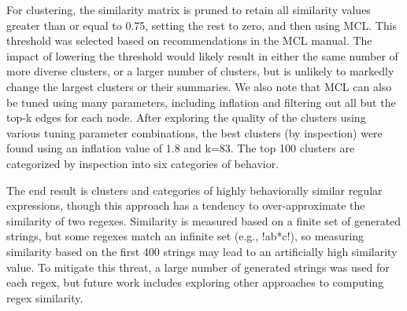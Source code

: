 For clustering, the similarity matrix is pruned to retain all similarity values greater than or equal to 0.75, setting the rest to zero, and then using MCL.
This threshold was selected based on recommendations in the MCL manual. The impact of lowering the threshold would likely result  in either the same number of more diverse clusters, or a larger number of clusters, but is unlikely to markedly change the largest clusters or their summaries.
We also note that MCL can also be tuned using many parameters, including inflation and filtering out all but the top-k edges for each node.
After exploring the quality of the clusters using various tuning parameter combinations, the best clusters (by inspection) were found using an inflation value of 1.8 and k=83.   The top 100 clusters are categorized by inspection into six categories of behavior.

The end result is clusters and categories of highly behaviorally similar regular expressions, though this approach has a tendency to over-approximate the similarity of two regexes. Similarity is measured based on a finite set of generated strings, but some regexes match an infinite set (e.g., \cverb!ab*c!), so measuring similarity based on the first 400 strings may lead to an artificially high similarity value. To mitigate this threat, a large number of generated strings was used for each regex, but future work includes exploring other approaches to computing regex similarity.
